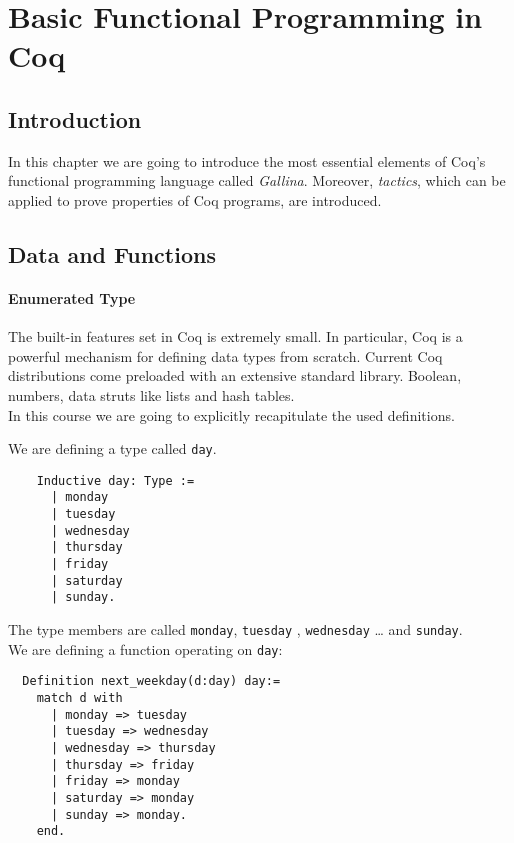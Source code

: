 \section{Basic Functional Programming in Coq}



\subsection{Introduction}

In this chapter we are going to introduce the most essential elements of Coq's functional programming language called {\itshape  Gallina}. 
Moreover, {\itshape tactics}, which can be applied to prove properties of Coq programs, are introduced.


\subsection{Data and Functions}

 \paragraph{Enumerated Type}
 
  The built-in features set in Coq is extremely small. In particular, Coq is a powerful mechanism for defining data types from scratch.
  Current Coq distributions come preloaded with an extensive standard library.
  Boolean, numbers, data struts like lists and hash tables.\\
  In this course we are going to explicitly recapitulate the used definitions.
   
  
  \begin{example}
  We are defining a type called \lstinline!day!.
  \begin{lstlisting}
    Inductive day: Type :=
	  | monday
	  | tuesday
	  | wednesday
	  | thursday
	  | friday
	  | saturday
	  | sunday.
	  \end{lstlisting} 
  
  The type members are called \lstinline!monday!, \lstinline!tuesday! , \lstinline!wednesday! \ldots{} and \lstinline!sunday!.\\
  
  We are defining a function operating on \lstinline!day!: 
  \begin{lstlisting}
  Definition next_weekday(d:day) day:=
    match d with 
	  | monday => tuesday
	  | tuesday => wednesday
	  | wednesday => thursday
	  | thursday => friday
	  | friday => monday
	  | saturday => monday
	  | sunday => monday.
    end.  
  \end{lstlisting}
  \end{example}

